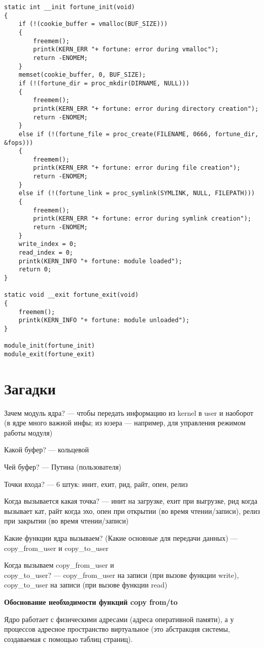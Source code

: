 \begin{lstlisting}
static int __init fortune_init(void) 
{
	if (!(cookie_buffer = vmalloc(BUF_SIZE))) 
	{
		freemem();
		printk(KERN_ERR "+ fortune: error during vmalloc");
		return -ENOMEM;
	}
	memset(cookie_buffer, 0, BUF_SIZE);
	if (!(fortune_dir = proc_mkdir(DIRNAME, NULL))) 
	{
		freemem();
		printk(KERN_ERR "+ fortune: error during directory creation");
		return -ENOMEM;
	} 
	else if (!(fortune_file = proc_create(FILENAME, 0666, fortune_dir, &fops))) 
	{
		freemem();
		printk(KERN_ERR "+ fortune: error during file creation");
		return -ENOMEM;
	} 
	else if (!(fortune_link = proc_symlink(SYMLINK, NULL, FILEPATH))) 
	{
		freemem();
		printk(KERN_ERR "+ fortune: error during symlink creation");
		return -ENOMEM;
	}
	write_index = 0;
	read_index = 0;
	printk(KERN_INFO "+ fortune: module loaded");
	return 0;
}

static void __exit fortune_exit(void) 
{
	freemem();
	printk(KERN_INFO "+ fortune: module unloaded");
}

module_init(fortune_init) 
module_exit(fortune_exit)
\end{lstlisting}

\section*{Загадки}

Зачем модуль ядра? --- чтобы передать информацию из kernel в user и наоборот (в ядре много важной инфы; из юзера --- например, для управления режимом работы модуля)

Какой буфер? --- кольцевой

Чей буфер? --- Путина (пользователя)

Точки входа? --- 6 штук: инит, ехит, рид, райт, опен, релиз

Когда вызывается какая точка? --- инит на загрузке, ехит при выгрузке, рид когда вызывает кат, райт когда эхо, опен при открытии (во время чтении/записи), релиз при закрытии (во время чтении/записи)

Какие функции ядра вызываем? (Какие основные для передачи данных) --- copy\_from\_user и copy\_to\_user

Когда вызываем copy\_from\_user и \\ copy\_to\_user? --- copy\_from\_user на записи (при вызове функции write),\\ copy\_to\_user на записи (при вызове функции read)

\textbf{Обоснование необходимости функций copy from/to}

Ядро работает с физическими адресами (адреса оперативной памяти), а у процессов адресное пространство виртуальное (это абстракция системы, создаваемая с помощью таблиц страниц).

